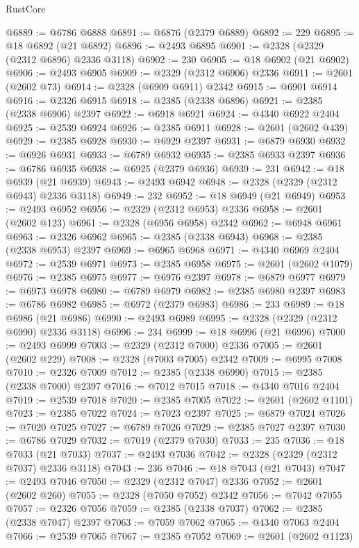 \begin{lexlean}{RustCore}
\begin{coremodule}
@6889 := @6786 @6888
@6891 := @6876 (@2379 @6889)
@6892 := 229
@6895 := @18 @6892 (@21 @6892)
@6896 := @2493 @6895
@6901 := @2328 (@2329 (@2312 @6896) @2336 @3118)
@6902 := 230
@6905 := @18 @6902 (@21 @6902)
@6906 := @2493 @6905
@6909 := @2329 (@2312 @6906) @2336
@6911 := @2601 (@2602 @73)
@6914 := @2328 (@6909 @6911) @2342
@6915 := @6901 @6914
@6916 := @2326 @6915
@6918 := @2385 (@2338 @6896)
@6921 := @2385 (@2338 @6906) @2397
@6922 := @6918 @6921
@6924 := @4340 @6922 @2404
@6925 := @2539 @6924
@6926 := @2385 @6911
@6928 := @2601 (@2602 @439)
@6929 := @2385 @6928
@6930 := @6929 @2397
@6931 := @6879 @6930
@6932 := @6926 @6931
@6933 := @6789 @6932
@6935 := @2385 @6933 @2397
@6936 := @6786 @6935
@6938 := @6925 (@2379 @6936)
@6939 := 231
@6942 := @18 @6939 (@21 @6939)
@6943 := @2493 @6942
@6948 := @2328 (@2329 (@2312 @6943) @2336 @3118)
@6949 := 232
@6952 := @18 @6949 (@21 @6949)
@6953 := @2493 @6952
@6956 := @2329 (@2312 @6953) @2336
@6958 := @2601 (@2602 @123)
@6961 := @2328 (@6956 @6958) @2342
@6962 := @6948 @6961
@6963 := @2326 @6962
@6965 := @2385 (@2338 @6943)
@6968 := @2385 (@2338 @6953) @2397
@6969 := @6965 @6968
@6971 := @4340 @6969 @2404
@6972 := @2539 @6971
@6973 := @2385 @6958
@6975 := @2601 (@2602 @1079)
@6976 := @2385 @6975
@6977 := @6976 @2397
@6978 := @6879 @6977
@6979 := @6973 @6978
@6980 := @6789 @6979
@6982 := @2385 @6980 @2397
@6983 := @6786 @6982
@6985 := @6972 (@2379 @6983)
@6986 := 233
@6989 := @18 @6986 (@21 @6986)
@6990 := @2493 @6989
@6995 := @2328 (@2329 (@2312 @6990) @2336 @3118)
@6996 := 234
@6999 := @18 @6996 (@21 @6996)
@7000 := @2493 @6999
@7003 := @2329 (@2312 @7000) @2336
@7005 := @2601 (@2602 @229)
@7008 := @2328 (@7003 @7005) @2342
@7009 := @6995 @7008
@7010 := @2326 @7009
@7012 := @2385 (@2338 @6990)
@7015 := @2385 (@2338 @7000) @2397
@7016 := @7012 @7015
@7018 := @4340 @7016 @2404
@7019 := @2539 @7018
@7020 := @2385 @7005
@7022 := @2601 (@2602 @1101)
@7023 := @2385 @7022
@7024 := @7023 @2397
@7025 := @6879 @7024
@7026 := @7020 @7025
@7027 := @6789 @7026
@7029 := @2385 @7027 @2397
@7030 := @6786 @7029
@7032 := @7019 (@2379 @7030)
@7033 := 235
@7036 := @18 @7033 (@21 @7033)
@7037 := @2493 @7036
@7042 := @2328 (@2329 (@2312 @7037) @2336 @3118)
@7043 := 236
@7046 := @18 @7043 (@21 @7043)
@7047 := @2493 @7046
@7050 := @2329 (@2312 @7047) @2336
@7052 := @2601 (@2602 @260)
@7055 := @2328 (@7050 @7052) @2342
@7056 := @7042 @7055
@7057 := @2326 @7056
@7059 := @2385 (@2338 @7037)
@7062 := @2385 (@2338 @7047) @2397
@7063 := @7059 @7062
@7065 := @4340 @7063 @2404
@7066 := @2539 @7065
@7067 := @2385 @7052
@7069 := @2601 (@2602 @1123)

\end{coremodule}
\end{lexlean}
